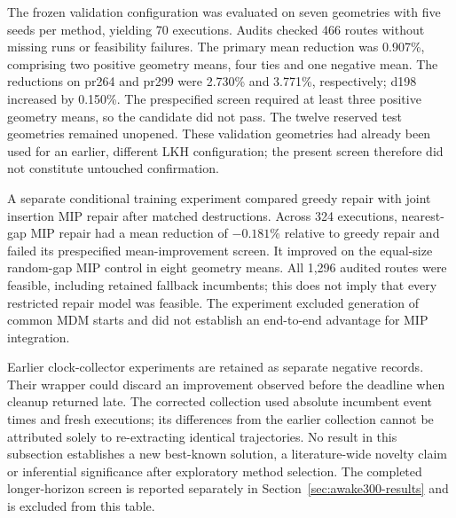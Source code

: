 The frozen validation configuration was evaluated on seven geometries with
five seeds per method, yielding 70 executions. Audits checked 466 routes
without missing runs or feasibility failures. The primary mean reduction
was 0.907\%, comprising two positive geometry means, four ties and one
negative mean. The reductions on pr264 and pr299 were 2.730\% and 3.771\%,
respectively; d198 increased by 0.150\%. The prespecified screen required
at least three positive geometry means, so the candidate did not pass.
The twelve reserved test geometries remained unopened. These validation
geometries had already been used for an earlier, different LKH configuration;
the present screen therefore did not constitute untouched confirmation.

A separate conditional training experiment compared greedy repair with
joint insertion MIP repair after matched destructions. Across 324 executions,
nearest-gap MIP repair had a mean reduction of $-0.181\%$ relative to greedy
repair and failed its prespecified mean-improvement screen. It improved on
the equal-size random-gap MIP control in eight geometry means. All 1,296
audited routes were feasible, including retained fallback incumbents; this
does not imply that every restricted repair model was feasible. The
experiment excluded generation of common MDM starts and did not establish
an end-to-end advantage for MIP integration.

Earlier clock-collector experiments are retained as separate negative
records. Their wrapper could discard an improvement observed before the
deadline when cleanup returned late. The corrected collection used absolute
incumbent event times and fresh executions; its differences from the earlier
collection cannot be attributed solely to re-extracting identical trajectories.
No result in this subsection establishes a new best-known solution, a
literature-wide novelty claim or inferential significance after exploratory
method selection. The completed longer-horizon screen is reported separately
in Section~\ref{sec:awake300-results} and is excluded from this table.
